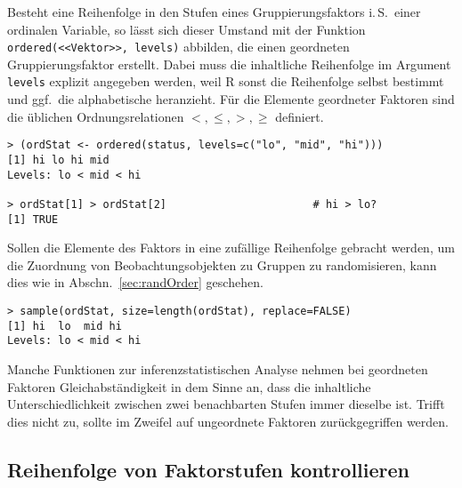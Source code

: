 Besteht eine Reihenfolge in den Stufen eines Gruppierungsfaktors i.\,S.\ einer ordinalen Variable, so lässt sich dieser Umstand mit der Funktion \lstinline!ordered(<<Vektor>>, levels)! abbilden, die einen geordneten Gruppierungsfaktor erstellt. Dabei muss die inhaltliche Reihenfolge im Argument \lstinline!levels! explizit angegeben werden, weil R sonst die Reihenfolge selbst bestimmt und ggf.\ die alphabetische heranzieht. Für die Elemente geordneter Faktoren sind die üblichen Ordnungsrelationen $<, \leq, >, \geq$ definiert.
\begin{lstlisting}
> (ordStat <- ordered(status, levels=c("lo", "mid", "hi")))
[1] hi lo hi mid
Levels: lo < mid < hi

> ordStat[1] > ordStat[2]                       # hi > lo?
[1] TRUE
\end{lstlisting}

Sollen die Elemente des Faktors in eine zufällige Reihenfolge gebracht werden, um die Zuordnung von Beobachtungsobjekten zu Gruppen zu randomisieren, kann dies wie in Abschn.\ \ref{sec:randOrder} geschehen.
\begin{lstlisting}
> sample(ordStat, size=length(ordStat), replace=FALSE)
[1] hi  lo  mid hi 
Levels: lo < mid < hi
\end{lstlisting}

Manche Funktionen zur inferenzstatistischen Analyse nehmen bei geordneten Faktoren Gleichabständigkeit in dem Sinne an, dass die inhaltliche Unterschiedlichkeit zwischen zwei benachbarten Stufen immer dieselbe ist. Trifft dies nicht zu, sollte im Zweifel auf ungeordnete Faktoren zurückgegriffen werden.

\subsection{Reihenfolge von Faktorstufen kontrollieren}
\label{sec:facLabelOrder}

